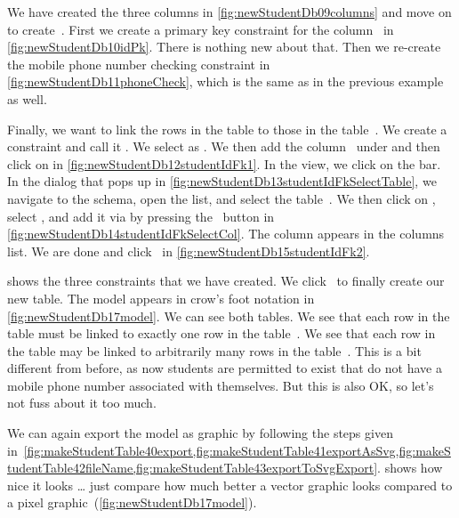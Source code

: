 We have created the three columns in \cref{fig:newStudentDb09columns} and move on to create~.
First we create a primary key constraint for the column~ in \cref{fig:newStudentDb10idPk}.
There is nothing new about that.
Then we re-create the mobile phone number checking constraint in \cref{fig:newStudentDb11phoneCheck}, which is the same as in the previous example as well.

Finally, we want to link the rows in the table  to those in the table~.
We create a  constraint and call it .
We select  as .
We then add the column~ under  and then click on  in \cref{fig:newStudentDb12studentIdFk1}.
In the  view, we click on the  bar.
In the dialog that pops up in \cref{fig:newStudentDb13studentIdFkSelectTable}, we navigate to the  schema, open the  list, and select the table~.
We then click on , select , and add it via by pressing the
~\pgmodelerAddItem button in \cref{fig:newStudentDb14studentIdFkSelectCol}.
The  column appears in the columns list.
We are done and click~ in \cref{fig:newStudentDb15studentIdFk2}.

 shows the three constraints that we have created.
We click~ to finally create our new table.
The model appears in crow's foot notation in \cref{fig:newStudentDb17model}.
We can see both tables.
We see that each row in the table  must be linked to exactly one row in the table~.
We see that each row in the table  may be linked to arbitrarily many rows in the table~.
This is a bit different from before, as now students are permitted to exist that do not have a mobile phone number associated with themselves.
But this is also OK, so let's not fuss about it too much.

We can again export the model as  graphic by following the steps given in~\cref{fig:makeStudentTable40export,fig:makeStudentTable41exportAsSvg,fig:makeStudentTable42fileName,fig:makeStudentTable43exportToSvgExport}.
 shows how nice it looks {\dots} just compare how much better a vector graphic looks compared to a pixel graphic~(\cref{fig:newStudentDb17model}).

